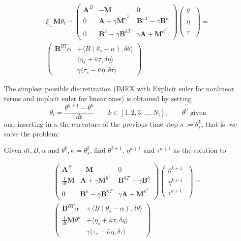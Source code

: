 \documentclass[12pt]{article}
\newcommand{\vv}[1]{\boldsymbol{#1}}
\begin{document}
\begin{multline}
\label{eq:4}
\xi_\perp\vv M \theta_t + 
\begin{pmatrix}
\vv A^B &  -\vv M & 0 \\
0 & 
 \vv A
+ \gamma \vv M^{\bar \kappa^2} &
 \vv B^{\bar\kappa T}
- \gamma\vv B^{\bar\kappa} \\
0 & 
 \vv B^{\bar\kappa}
- \gamma\vv B^{\bar\kappa T} 
&
%
%
\gamma \vv A
+ \vv M^{\bar \kappa^2}
\end{pmatrix}
%
\begin{pmatrix}
\theta\phantom{\big|\!\!}\\
\eta\phantom{\big|\!\!} \\
\tau\phantom{\big|\!\!}
\end{pmatrix}
=\\
\begin{pmatrix}
\vv B^{BT}\alpha & +\langle B(\theta_s-\alpha), \delta \theta\rangle\\
& \langle \eta_s+\bar\kappa\tau,\delta\eta\rangle
\\
&\gamma\langle\tau_{s}-\bar \kappa\eta, \delta\tau\rangle 
\end{pmatrix}
\end{multline}

The simplest possible discretization (IMEX with Explicit euler for
nonlinear terms and implicit euler for linear ones) is obtained by
setting
$$
\theta_t = \frac{\theta^{k+1} - \theta^k}{dt} \qquad k \in
[1,2,3,\ldots, N_t], \qquad \theta^0 \text{ given}
$$
and inserting in $\bar \kappa$ the curvature of the previous time step
$\bar \kappa := \theta^k_s$, that is, we solve the problem:

Given $dt, B, \alpha$ and $\theta^k, \bar \kappa = \theta^k_s$, find
$\theta^{k+1}$, $\eta^{k+1}$ and $\tau^{k+1}$ as the solution to

\begin{multline}
\label{eq:4}
\begin{pmatrix}
\vv A^B &  -\vv M & 0 \\
\frac{1}{dt} \vv M& 
 \vv A
+ \gamma \vv M^{\bar \kappa^2} &
 \vv B^{\bar\kappa T}
- \gamma\vv B^{\bar\kappa} \\
0 & 
 \vv B^{\bar\kappa}
- \gamma\vv B^{\bar\kappa T} 
&
%
%
\gamma \vv A
+ \vv M^{\bar \kappa^2}
\end{pmatrix}
%
\begin{pmatrix}
\theta^{k+1}\phantom{\big|\!\!}\\
\eta^{k+1}\phantom{\big|\!\!} \\
\tau^{k+1}\phantom{\big|\!\!}
\end{pmatrix}
=\\
\begin{pmatrix}
\vv B^{BT}\alpha & +\langle B(\theta_s-\alpha), \delta \theta\rangle\\
\frac{1}{dt} \vv M \theta^k& +\langle \eta_s+\bar\kappa\tau,\delta\eta\rangle
\\
&\gamma\langle\tau_{s}-\bar \kappa\eta, \delta\tau\rangle 
\end{pmatrix}
\end{multline}
\end{document}
